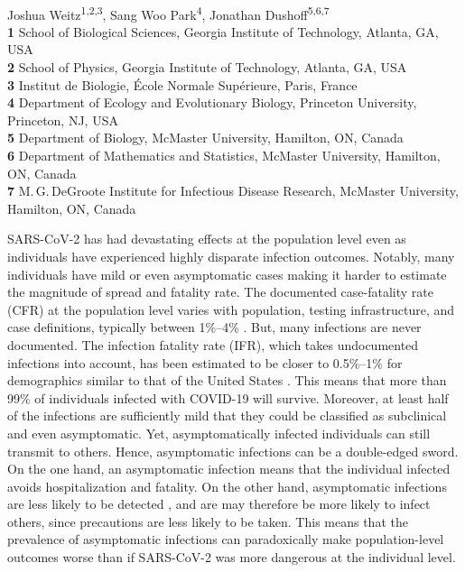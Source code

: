 \documentclass[12pt]{article}
\date{\today}
\begin{document}
\begin{flushleft}{
	\Large
	\textbf{}
}
\newline
\\
Joshua Weitz\textsuperscript{1,2,3},
Sang Woo Park\textsuperscript{4},
Jonathan Dushoff\textsuperscript{5,6,7}
\\
\bigskip
\textbf{1} School of Biological Sciences, Georgia Institute of Technology, Atlanta, GA, USA
\\
\textbf{2} School of Physics, Georgia Institute of Technology, Atlanta, GA, USA
\\
\textbf{3} Institut de Biologie, \'{E}cole Normale Sup\'{e}rieure, Paris, France
\\
\textbf{4} Department of Ecology and Evolutionary Biology, Princeton University, Princeton, NJ, USA
\\
\textbf{5} Department of Biology, McMaster University, Hamilton, ON, Canada
\\
\textbf{6} Department of Mathematics and Statistics, McMaster University, Hamilton, ON, Canada
\\
\textbf{7} M.\,G.\,DeGroote Institute for Infectious Disease Research, McMaster University, Hamilton, ON, Canada
\\
\bigskip

\bigskip
\end{flushleft}

SARS-CoV-2 has had devastating effects at the population level even as individuals have experienced highly disparate infection outcomes.
Notably, many individuals have mild or even asymptomatic cases making it harder to estimate the magnitude of spread and fatality rate. 
The documented case-fatality rate (CFR) at the population level varies with population, testing infrastructure, and case definitions, typically between 1\%--4\% \citep{rajgor2020many,VERITY2020669,yang2020early}.
But, many infections are never documented. 
The infection fatality rate (IFR), which takes undocumented infections into account, has been estimated to be closer to 0.5\%--1\% for demographics similar to that of the United States \citep{levin2020assessing}. 
This means that more than 99\% of individuals infected with COVID-19 will survive. 
Moreover, at least half of the infections are sufficiently mild that they could be classified as subclinical and even asymptomatic. 
Yet, asymptomatically infected individuals can still transmit to others. 
Hence, asymptomatic infections can be a double-edged sword.
On the one hand, an asymptomatic infection means that the individual infected avoids hospitalization and fatality. 
On the other hand, asymptomatic infections are less likely to be detected \citep{fraser2004factors}, and are may therefore be more likely to infect others, since precautions are less likely to be taken.
This means that the prevalence of asymptomatic infections can paradoxically make population-level outcomes worse than if SARS-CoV-2 was more dangerous at the individual level.
\end{document}
